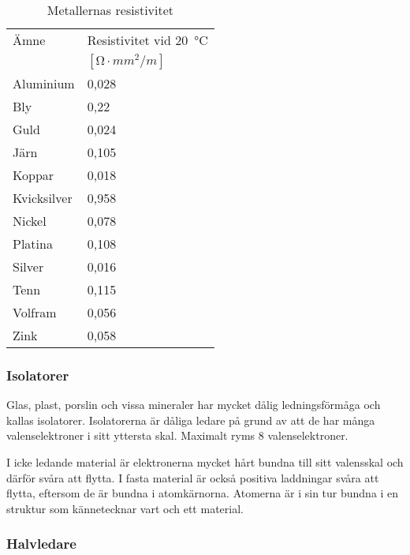 \begin{table}
  \begin{center}
\begin{tabular}{l|l}
  Ämne & Resistivitet vid \qty{20}{\degreeCelsius} \\
   & \([\unit{\ohm} \cdot mm^2 / m]\) \\
  \hline
  Aluminium   & 0,028 \\
  Bly         & 0,22  \\
  Guld        & 0,024 \\
  Järn        & 0,105 \\
  Koppar      & 0,018 \\
  Kvicksilver & 0,958 \\
  Nickel      & 0,078 \\
  Platina     & 0,108 \\
  Silver      & 0,016 \\
  Tenn        & 0,115 \\
  Volfram     & 0,056 \\
  Zink        & 0,058 \\
\end{tabular}
\end{center}
  \caption{Metallernas resistivitet}
          \label{table:metaller}
\end{table}

\subsubsection{Isolatorer}
\label{isolator}

Glas, plast, porslin och vissa mineraler har mycket dålig ledningsförmåga och
kallas isolatorer.
Isolatorerna är dåliga ledare på grund av att de har många valenselektroner i
sitt yttersta skal.
Maximalt ryms 8 valenselektroner.

I icke ledande material är elektronerna mycket hårt bundna till sitt valensskal
och därför svåra att flytta.
I fasta material är också positiva laddningar svåra att flytta, eftersom de är
bundna i atomkärnorna.
Atomerna är i sin tur bundna i en struktur som kännetecknar vart och ett
material.

\subsubsection{Halvledare}
\label{halvledare}

